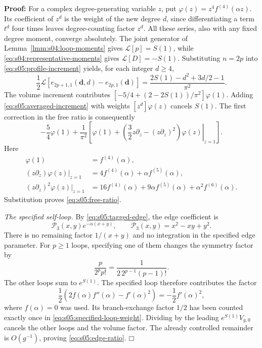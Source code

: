\documentclass[a4paper,10pt]{article}
\numberwithin{equation}{section}
\theoremstyle{paperplain}
\theoremstyle{paperremark}
\theoremstyle{paperplain}
\newenvironment{prf}{\noindent \textbf{Proof: }}{\hfill $\mdlgwhtsquare$\par\addvspace{0.5\baselineskip}}
\begin{document}
\begin{prf}
For a complex degree-generating variable $z$, put
$\varphi(z)=z^4f^{(4)}(\alpha z)$. Its coefficient of $z^d$
is the weight of the new degree $d$, since differentiating a term
$t^d$ four times leaves degree-counting factor $z^d$.
All these series, also with any fixed degree moment, converge
absolutely. The joint generator of Lemma~\ref{lmm:s04:loop-moments}
gives $\mathcal L[p]=S(1)$, while
\eqref{eq:s04:representative-moments} gives
$\mathcal L[D]=-S(1)$. Substituting $n=2p$ into
\eqref{eq:s05:profile-increment} yields, for each integer $d\geq4$,
\begin{equation}\label{eq:s05:averaged-increment}
 \frac12\mathcal L\left[
   e_{2p+1,1}(\mathbf d,d)-e_{2p,1}(\mathbf d)\right]
 =\frac{2S(1)-d^2+3d/2-1}{\pi^2}.
\end{equation}
The volume increment contributes
$[-5/4+(2-2S(1))/\pi^2]\varphi(1)$.
Adding \eqref{eq:s05:averaged-increment} with weights
$[z^d]\varphi(z)$ cancels $S(1)$. The first correction in the
free ratio is consequently
\begin{equation}\label{eq:s05:free-moment}
 -\frac54\varphi(1)+\frac1{\pi^2}
 \left[\varphi(1)+\left.
  \left(\frac32z\partial_z-(z\partial_z)^2\right)
                  \varphi(z)\right|_{z=1}\right].
\end{equation}
Here
\begin{align*}
 \varphi(1)&=f^{(4)}(\alpha),\\
 (z\partial_z)\varphi(z)|_{z=1}
       &=4f^{(4)}(\alpha)+\alpha f^{(5)}(\alpha),\\
 (z\partial_z)^2\varphi(z)|_{z=1}
       &=16f^{(4)}(\alpha)+9\alpha f^{(5)}(\alpha)
                                     +\alpha^2f^{(6)}(\alpha).
\end{align*}
Substitution proves \eqref{eq:s05:free-ratio}.

\emph{The specified self-loop.}
By \eqref{eq:s05:tagged-edge}, the edge coefficient is
\[
 \mathcal P_3(x,y)e^{-\alpha(x+y)},\qquad
 \mathcal P_3(x,y)=x^2-xy+y^2.
\]
There is no remaining factor $1/(x+y)$ and no integration in the
specified edge parameter.
For $p\geq1$ loops, specifying one of them changes the symmetry
factor by
\begin{equation}\label{eq:s05:specified-loop-weight}
 \frac{p}{2^pp!}=\frac1{2\,2^{p-1}(p-1)!}.
\end{equation}
The other loops sum to $e^{S(1)}$. The specified loop therefore
contributes the factor
\[
 \frac12\left(2f(\alpha)f''(\alpha)-f'(\alpha)^2\right)
       =-\frac12f'(\alpha)^2,
\]
where $f(\alpha)=0$ was used. Its branch-exchange factor $1/2$
has been counted exactly once in
\eqref{eq:s05:specified-loop-weight}. Dividing by the leading
$e^{S(1)}V_{g,0}$ cancels the other loops and the volume factor.
The already controlled remainder is $O(g^{-1})$, proving
\eqref{eq:s05:edge-ratio}.
\end{prf}
\end{document}
